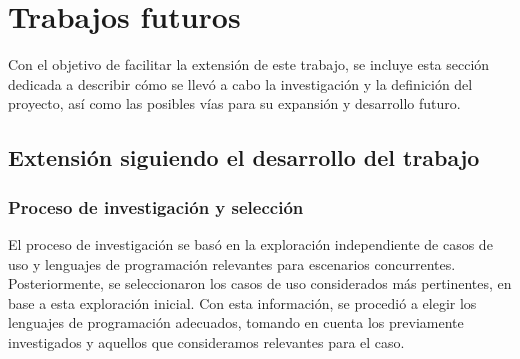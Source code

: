 \documentclass[11pt]{article}
\let\Oldsection\section
\renewcommand{\section}{\FloatBarrier\Oldsection}
\let\Oldsubsection\subsection
\renewcommand{\subsection}{\FloatBarrier\Oldsubsection}
\let\Oldsubsubsection\subsubsection
\renewcommand{\subsubsection}{\FloatBarrier\Oldsubsubsection}
\begin{document}


\newpage

\section{Trabajos futuros}

Con el objetivo de facilitar la extensión de este trabajo, se incluye esta sección dedicada a describir cómo se llevó a cabo la investigación y la definición del proyecto, así como las posibles vías para su expansión y desarrollo futuro.

\subsection{Extensión siguiendo el desarrollo del trabajo}

\subsubsection{Proceso de investigación y selección}

El proceso de investigación se basó en la exploración independiente de casos de uso y lenguajes de programación relevantes para escenarios concurrentes. Posteriormente, se seleccionaron los casos de uso considerados más pertinentes, en base a esta exploración inicial. Con esta información, se procedió a elegir los lenguajes de programación adecuados, tomando en cuenta los previamente investigados y aquellos que consideramos relevantes para el caso.
\end{document}
